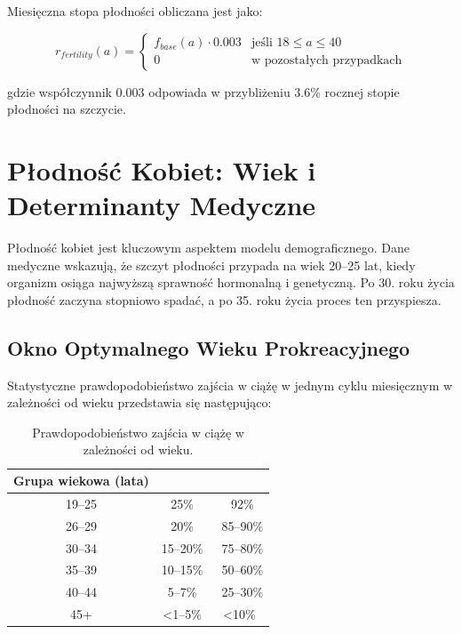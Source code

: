 \documentclass[]{article}
\begin{document}
Miesięczna stopa płodności obliczana jest jako:

\begin{equation}
r_{fertility}(a) = \begin{cases}
f_{base}(a) \cdot 0.003 & \text{jeśli } 18 \le a \le 40 \\
0 & \text{w pozostałych przypadkach}
\end{cases}
\end{equation}

gdzie współczynnik 0.003 odpowiada w przybliżeniu 3.6\% rocznej stopie płodności na szczycie.

\section{Płodność Kobiet: Wiek i Determinanty Medyczne}

Płodność kobiet jest kluczowym aspektem modelu demograficznego. Dane medyczne wskazują, że szczyt płodności przypada na wiek 20–25 lat, kiedy organizm osiąga najwyższą sprawność hormonalną i genetyczną. Po 30. roku życia płodność zaczyna stopniowo spadać, a po 35. roku życia proces ten przyspiesza.

\subsection{Okno Optymalnego Wieku Prokreacyjnego}

Statystyczne prawdopodobieństwo zajścia w ciążę w jednym cyklu miesięcznym w zależności od wieku przedstawia się następująco:

\begin{table}[h!]
\centering
\begin{tabular}{|c|c|c|}
\hline
\textbf{Grupa wiekowa (lata)} & \textbf{Szansa na ciążę w cyklu (\\%
\hline
19–25 & 25\% & ~92\% \\
26–29 & 20\% & ~85–90\% \\
30–34 & 15–20\% & ~75–80\% \\
35–39 & 10–15\% & ~50–60\% \\
40–44 & 5–7\% & ~25–30\% \\
45+ & <1–5\% & <10\% \\
\hline
\end{tabular}
\caption{Prawdopodobieństwo zajścia w ciążę w zależności od wieku.}
\end{table}
\end{document}
